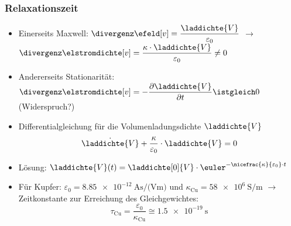 \begin{frame}
  \frametitle{Relaxationszeit}

\begin{itemize}[<+->]      
\item Einerseits Maxwell: $\divergenz \efeld[v] = \dfrac{\laddichte{V}}{\varepsilon_0}$ $\to$
$\divergenz \elstromdichte[v] = \dfrac{\kappa \cdot \laddichte{V}}{\varepsilon_0} \neq 0$
\item Andererseits Stationarität: $\divergenz \elstromdichte[v] = -\dfrac{\partial \laddichte{V}}{\partial t} \istgleich 0$ (Widerspruch?)
\item Differentialgleichung für die Volumenladungsdichte \(\laddichte{V} \)
\begin{equation*}
	\dot{\laddichte{V}} + \dfrac{\kappa}{\varepsilon_0} \cdot \laddichte{V} = 0
\end{equation*}
\item Lösung: 
$\laddichte{V}(t) = \laddichte[0]{V} \cdot \euler^{-\nicefrac{\kappa}{\varepsilon_0} \cdot t}$

\item Für Kupfer: \(\varepsilon_0 = \SI{8,85e-12}{\ampere\second\per(\volt\metre)} \) und \(\kappa_\mathrm{Cu} = \SI{58e6}{\siemens\per\metre} \) $\to$ Zeitkonstante zur Erreichung des Gleichgewichtes:
\begin{equation*}
	\tau_\mathrm{Cu} = \dfrac{\varepsilon_0}{\kappa_\mathrm{Cu}} \cong \SI{1,5e-19}{\second}
\end{equation*}
\end{itemize}
 \end{frame}

